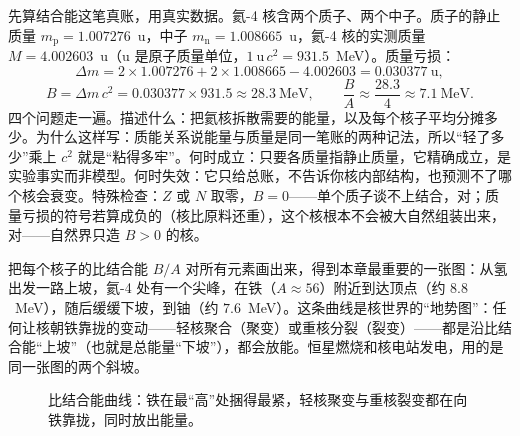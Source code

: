 
先算结合能这笔真账，用真实数据。氦-4 核含两个质子、两个中子。质子的静止质量 \(m_{\mathrm p}=1.007276\)~u，中子 \(m_{\mathrm n}=1.008665\)~u，氦-4 核的实测质量 \(M=4.002603\)~u（u 是原子质量单位，\(1~\mathrm{u}\,c^{2}=931.5\)~MeV）。质量亏损：
\[
\Delta m=2\times1.007276+2\times1.008665-4.002603=0.030377~\mathrm{u},
\]
\[
B=\Delta m\,c^{2}=0.030377\times931.5\approx28.3~\mathrm{MeV},
\qquad \frac{B}{A}\approx\frac{28.3}{4}\approx7.1~\mathrm{MeV}.
\]
四个问题走一遍。描述什么：把氦核拆散需要的能量，以及每个核子平均分摊多少。为什么这样写：质能关系说能量与质量是同一笔账的两种记法，所以“轻了多少”乘上 \(c^2\) 就是“粘得多牢”。何时成立：只要各质量指静止质量，它精确成立，是实验事实而非模型。何时失效：它只给总账，不告诉你核内部结构，也预测不了哪个核会衰变。特殊检查：\(Z\) 或 \(N\) 取零，\(B=0\)——单个质子谈不上结合，对；质量亏损的符号若算成负的（核比原料还重），这个核根本不会被大自然组装出来，对——自然界只造 \(B>0\) 的核。

把每个核子的比结合能 \(B/A\) 对所有元素画出来，得到本章最重要的一张图：从氢出发一路上坡，氦-4 处有一个尖峰，在铁（\(A\approx56\)）附近到达顶点（约 \(8.8\)~MeV），随后缓缓下坡，到铀（约 \(7.6\)~MeV）。这条曲线是核世界的“地势图”：任何让核朝铁靠拢的变动——轻核聚合（聚变）或重核分裂（裂变）——都是沿比结合能“上坡”（也就是总能量“下坡”），都会放能。恒星燃烧和核电站发电，用的是同一张图的两个斜坡。

\begin{figure}[htbp]
\centering
{}
\caption{比结合能曲线：铁在最“高”处捆得最紧，轻核聚变与重核裂变都在向铁靠拢，同时放出能量。}
\end{figure}

